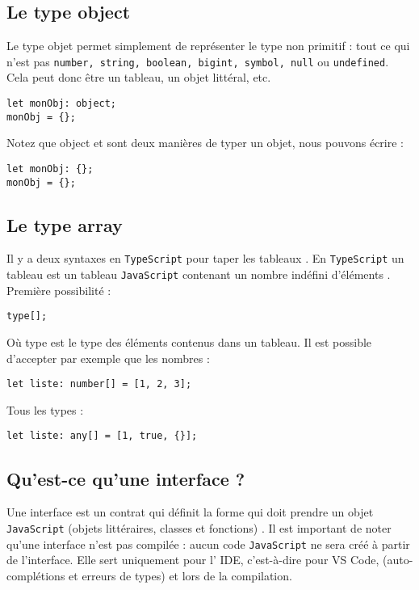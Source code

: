 \subsection{Le type {\color{monOrange}object}}
Le type {\color{monOrange}objet} permet simplement de représenter le type {\color{blue}non primitif} : tout ce qui n'est pas {\tt number, string, boolean, bigint, symbol, null} ou {\tt undefined}. Cela peut donc être un tableau, un objet littéral, etc.
\begin{verbatim}
let monObj: object;
monObj = {};
\end{verbatim}

Notez que {\color{monOrange}object} et {\color{monOrange}{}} sont deux manières de typer un objet, nous pouvons écrire :
\begin{verbatim}
let monObj: {};
monObj = {};
\end{verbatim}

\subsection{Le type {\color{monOrange}array}}
Il y a deux syntaxes en {\tt TypeScript} pour taper les {\color{monOrange}tableaux} . En {\tt TypeScript} un tableau est un tableau {\tt JavaScript} contenant un nombre indéfini d'éléments . Première possibilité :
\begin{verbatim}
type[];
\end{verbatim}

Où type est le type des éléments contenus dans un tableau. Il est possible d'accepter par exemple que les nombres :
\begin{verbatim}
let liste: number[] = [1, 2, 3];
\end{verbatim}
Tous les types :
\begin{verbatim}
let liste: any[] = [1, true, {}];
\end{verbatim}

\subsection{Qu'est-ce qu'une {\color{monOrange}interface} ?}
Une {\color{monOrange}interface} est un contrat qui définit la forme qui doit prendre un objet {\tt JavaScript} (objets littéraires, classes et fonctions) . Il est important de noter qu'une {\color{monOrange}interface} n'est pas compilée : aucun code {\tt JavaScript} ne sera créé à partir de l'interface. Elle sert uniquement pour l' IDE, c'est-à-dire pour {\color{blue}VS Code}, (auto-complétions et erreurs de types) et lors de la compilation.


